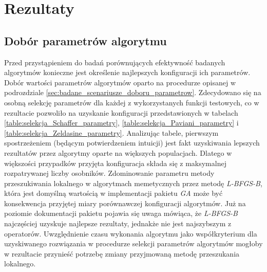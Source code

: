 \chapter{Rezultaty}
\section{Dobór parametrów algorytmu}
Przed przystąpieniem do badań porównujących efektywność badanych algorytmów konieczne jest określenie najlepszych konfiguracji ich parametrów. Dobór wartości parametrów algorytmów oparto na procedurze opisanej w podrozdziale \ref{sec:badane_scenariusze_doboru_parametrow}. Zdecydowano się na osobną selekcję parametrów dla każdej z wykorzystanych funkcji testowych, co w rezultacie pozwoliło na uzyskanie konfiguracji przedstawionych w tabelach \ref{table:selekcja_Schaffer_parametry}, \ref{table:selekcja_Paviani_parametry} i \ref{table:selekcja_Zeldasine_parametry}. Analizując tabele, pierwszym spostrzeżeniem (będącym potwierdzeniem intuicji) jest fakt uzyskiwania lepszych rezultatów przez algorytmy oparte na większych populacjach. Dlatego w większości przypadków przyjęta konfiguracja składa się z maksymalnej rozpatrywanej liczby osobników. Zdominowanie parametru metody przeszukiwania lokalnego w algorytmach memetycznych przez metodę \emph{L-BFGS-B}, która jest domyślną wartością w implementacji pakietu \emph{GA} może być konsekwencja przyjętej miary porównawczej konfiguracji algorytmów. Już na poziomie dokumentacji pakietu pojawia się uwaga mówiąca, że \emph{L-BFGS-B} najczęściej uzyskuje najlepsze rezultaty, jednakże nie jest najszybszym z operatorów. Uwzględnienie czasu wykonania algorytmu jako współkryterium dla uzyskiwanego rozwiązania w procedurze selekcji parametrów algorytmów mogłoby w rezultacie przynieść potrzebę zmiany przyjmowaną metodę przeszukania lokalnego.

